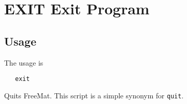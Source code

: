 \section{EXIT Exit Program}

\subsection{Usage}

The usage is
\begin{verbatim}
   exit
\end{verbatim}
Quits FreeMat.  This script is a simple synonym for \verb|quit|.
